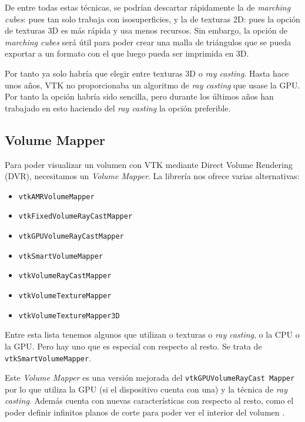 De entre todas estas técnicas, se podrían descartar rápidamente la de \textit{marching cubes}: pues tan solo trabaja con isosuperficies, y la de texturas 2D: pues la opción de texturas 3D es más rápida y usa menos recursos. Sin embargo, la opción de \textit{marching cubes} será útil para poder crear una malla de triángulos que se pueda exportar a un formato con el que luego pueda ser imprimida en 3D.

Por tanto ya solo habría que elegir entre texturas 3D o \textit{ray casting}. Hasta hace unos años, VTK no proporcionaba un algoritmo de \textit{ray casting} que usase la GPU. Por tanto la opción habría sido sencilla, pero durante los últimos años han trabajado en esto haciendo del \textit{ray casting} la opción preferible.

\subsection{Volume Mapper}

Para poder visualizar un volumen con VTK mediante Direct Volume Rendering (DVR), necesitamos un \textit{Volume Mapper}. La librería nos ofrece varias alternativas:

\begin{itemize}
	\item \texttt{vtkAMRVolumeMapper}
	\item \texttt{vtkFixedVolumeRayCastMapper}
	\item \texttt{vtkGPUVolumeRayCastMapper}
	\item \texttt{vtkSmartVolumeMapper}
	\item \texttt{vtkVolumeRayCastMapper}
	\item \texttt{vtkVolumeTextureMapper}
	\item \texttt{vtkVolumeTextureMapper3D}
\end{itemize}

Entre esta lista tenemos algunos que utilizan o texturas o \textit{ray casting}, o la CPU o la GPU. Pero hay uno que es especial con respecto al resto. Se trata de \texttt{vtkSmartVolumeMapper}.

Este \textit{Volume Mapper} es una versión mejorada del \texttt{vtkGPUVolumeRayCast Mapper} por lo que utiliza la GPU (si el dispositivo cuenta con una) y la técnica de \textit{ray casting}. Además cuenta con nuevas características con respecto al resto, como el poder definir infinitos planos de corte para poder ver el interior del volumen \cite{smart_volume_mapper}.

